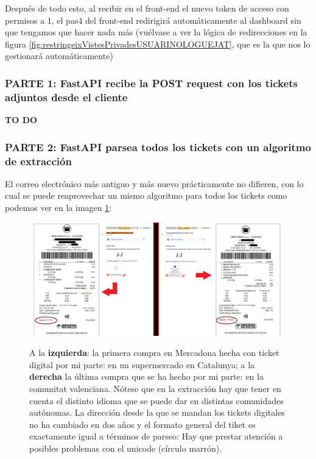 \documentclass[a4paper,12pt]{report}
\begin{document}
	
	Después de todo esto, al recibir en el front-end el nuevo token de acceso con permisos a 1, el pas4 del front-end redirigirá automáticamente al dashboard sin que tengamos que hacer nada más (vuélvase a ver la lógica de redirecciones en la figura \ref{fig:restringeixVistesPrivadesUSUARINOLOGUEJAT}, que es la que nos lo gestionará automáticamente)
	
		
		
		
		
		\subsubsection{PARTE 1:  FastAPI recibe la POST \textbf{request} con los tickets adjuntos desde el cliente}
		\label{sec:PARTE1_FASTAPI}
		
		\textbf{TO DO}
		
		\subsubsection{PARTE 2: FastAPI parsea todos los tickets con un algoritmo de extracción}
		\label{sec:PARTE2_FASTAPI}
		El correo electrónico más antiguo y más nuevo prácticamente no difieren, con lo cual se puede reaprovechar un mismo algoritmo para todos los tickets como podemos ver en la imagen \ref{fig:primerIultimTiketMeuCorreu}:
		
		
		
		\FloatBarrier
		\setlength{\belowcaptionskip}{3pt}
		\begin{figure}[H]
			\centering
			\caption{A la \textbf{izquierda}: la primera compra en Mercadona hecha con ticket digital por mi parte: en un supermercado en Catalunya; a la \textbf{derecha} la última compra que se ha hecho por mi parte: en la comunitat valenciana. Nótese que en la extracción hay que tener en cuenta el distinto idioma que se puede dar en distintas comunidades autónomas. La dirección desde la que se mandan los tickets digitales no ha cambiado en dos años y el formato general del tiket es exactamente igual a términos de parseo: Hay que prestar atención a posibles problemas con el unicode (círculo marrón).}
			\includegraphics[width=1\linewidth]{img/primerIultimTiketMeuCorreu}
			\label{fig:primerIultimTiketMeuCorreu}
		\end{figure}
		\FloatBarrier
		
\end{document}
